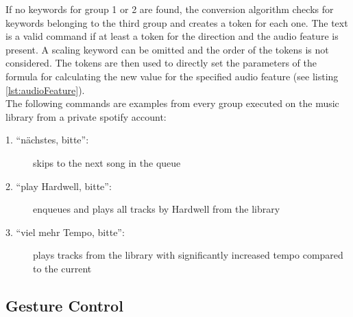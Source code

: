 If no keywords for group 1 or 2 are found, the conversion algorithm checks for keywords belonging to the third group and creates a token for each one. The text is a valid command if at least a token for the direction and the audio feature is present. A scaling keyword can be omitted and the order of the tokens is not considered. The tokens are then used to directly set the parameters of the formula for calculating the new value for the specified audio feature (see listing \ref{lst:audioFeature}).\\

The following commands are examples from every group executed on the music library from a private spotify account:
\begin{description}
	\item[1. ``n\"achstes, bitte'':] skips to the next song in the queue
	\item[2. ``play Hardwell, bitte'':] enqueues and plays all tracks by Hardwell from the library
	\item[3. ``viel mehr Tempo, bitte'':] plays tracks from the library with significantly increased tempo compared to the current
\end{description}


\subsection{Gesture Control}







